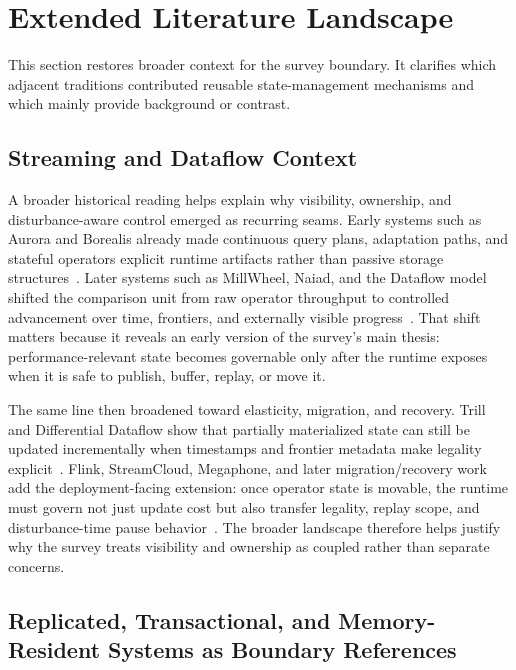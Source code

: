\section{Extended Literature Landscape}

This section restores broader context for the survey boundary. It clarifies which adjacent traditions contributed reusable state-management mechanisms and which mainly provide background or contrast.

\subsection{Streaming and Dataflow Context}

A broader historical reading helps explain why visibility, ownership, and disturbance-aware control emerged as recurring seams. Early systems such as Aurora and Borealis already made continuous query plans, adaptation paths, and stateful operators explicit runtime artifacts rather than passive storage structures~\cite{abadi2003aurora,abadi2005borealis}. Later systems such as MillWheel, Naiad, and the Dataflow model shifted the comparison unit from raw operator throughput to controlled advancement over time, frontiers, and externally visible progress~\cite{akidau2013millwheel,murray2013naiad,akidau2015dataflow}. That shift matters because it reveals an early version of the survey's main thesis: performance-relevant state becomes governable only after the runtime exposes when it is safe to publish, buffer, replay, or move it.

The same line then broadened toward elasticity, migration, and recovery. Trill and Differential Dataflow show that partially materialized state can still be updated incrementally when timestamps and frontier metadata make legality explicit~\cite{chandramouli2014trill,murray2013differential}. Flink, StreamCloud, Megaphone, and later migration/recovery work add the deployment-facing extension: once operator state is movable, the runtime must govern not just update cost but also transfer legality, replay scope, and disturbance-time pause behavior~\cite{carbone2015flink,gulisano2012streamcloud,nasir2019megaphone,zhao2024recovery,mao2025spacker}. The broader landscape therefore helps justify why the survey treats visibility and ownership as coupled rather than separate concerns.

\subsection{Replicated, Transactional, and Memory-Resident Systems as Boundary References}

